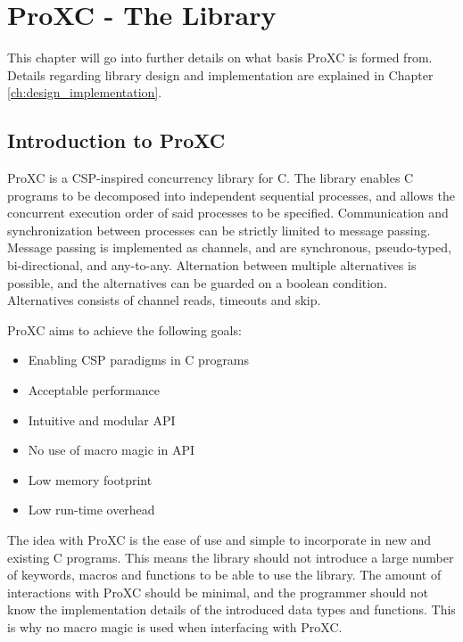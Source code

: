 
\chapter{ProXC - The Library}
\label{ch:proxc_library}

This chapter will go into further details on what basis ProXC is formed from. Details regarding library design and implementation are explained in Chapter \ref{ch:design_implementation}. 


\section{Introduction to ProXC}
\label{sec:proxc_intro}

ProXC is a CSP\hyp{}inspired concurrency library for C. The library enables C programs to be decomposed into independent sequential processes, and allows the concurrent execution order of said processes to be specified. Communication and synchronization between processes can be strictly lim\-ited to message passing. Message passing is implemented as channels, and are synch\-ronous, pseudo\hyp{}typed, bi\hyp{}directional, and any\hyp{}to\hyp{}any. Alternation between multiple alternatives is possible, and the alternatives can be guarded on a boolean condition. Alternatives consists of channel reads, timeouts and skip. 

ProXC aims to achieve the following goals:
\begin{itemize}[topsep=0em,itemsep=-1em,partopsep=-1em,parsep=1em]
    \item Enabling CSP paradigms in C programs
    \item Acceptable performance
    \item Intuitive and modular API
    \item No use of macro magic in API
    \item Low memory footprint
    \item Low run\hyp{}time overhead
\end{itemize}

The idea with ProXC is the ease of use and simple to incorporate in new and existing C programs. This means the library should not introduce a large number of keywords, macros and functions to be able to use the library. The amount of interactions with ProXC should be minimal, and the programmer should not know the implementation details of the introduced data types and functions. This is why no macro magic is used when interfacing with ProXC. 

